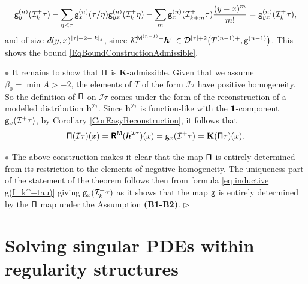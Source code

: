 \documentclass[10pt, reqno]{amsart}
\numberwithin{subsection}{section}
\numberwithin{subsubsection}{subsection}
\numberwithin{equation}{section} %
\newenvironment{Dem}[1][\unskip]{%
    \begin{list}{\hspace{1.15cm}{\sf \textbf{{\small Proof #1 --}}}}{%
        \setlength{\topsep}{0pt}%
        \setlength{\leftmargin}{0pt}%
        \setlength{\rightmargin}{0pt}%
        \setlength{\listparindent}{0pt}%
        \setlength{\itemindent}{0pt}%
        \setlength{\parsep}{0pt}%
        \addtolength{\leftmargin}{0pt}%
        \addtolength{\rightmargin}{0pt}%
    } \item }{\hfill $\rhd$\end{list}\smallskip}
\theoremstyle{mystyle}
\theoremstyle{mystyle2}
\theoremstyle{mystyle3}
\newcommand{\bsh}{\boldsymbol{h}}
\newcommand{\ssk}{\smallskip}
\newcommand{\mcD}{\mathcal{D}}
\newcommand{\mcI}{\mathcal{I}}
\newcommand{\mcK}{\mathcal{K}}
\newcommand{\bfK}{\mathbf{K}}
\begin{document}
\begin{Dem}
$$
{\sf g}^{(n)}_y(\mcI_k^+\tau)  -  \sum_{\eta<\tau} {\sf g}^{(n)}_x(\tau/\eta){\sf g}^{(n)}_{yx}(\mcI_k^+\eta)  -  \sum_m {\sf g}^{(n)}_x(\mcI_{k+m}^+\tau)\frac{(y - x)^m}{m!} = {\sf g}^{(n)}_{yx}(\mcI^+_k\tau),
$$
and of size $d(y,x)^{|\tau|+2-|k|_\frak{s}}$, since $\mcK^{{\sf M}^{(n-1)}+} \bsh^\tau\in\mcD^{|\tau|+2}\big(T^{(n-1)+}, {\sf g}^{(n-1)}\big)$. This shows the bound \eqref{EqBoundConstructionAdmissible}.

\textcolor{gray}{$\bullet$} It remains to show that ${\sf\Pi}$ is $\bfK$-admissible. Given that we assume $\beta_0=\min A>-2$, the elements of $T$ of the form $\mcI\tau$ have positive homogeneity. So the definition of ${\sf\Pi}$ on $\mcI\tau$ comes under the form of the reconstruction of a modelled distribution $\bsh^{\mcI\tau}$. Since $\bsh^{\mcI\tau}$ is function-like with the ${\bf1}$-component ${\sf g}_x(\mcI^+\tau)$, by Corollary \ref{CorEasyReconstruction}, it follows that
\begin{align*}
{\sf\Pi}(\mcI\tau)(x) = \textbf{\textsf{R}}^{\sf M} (\bsh^{\mcI\tau})(x) = {\sf g}_x(\mcI^+\tau) = \bfK({\sf\Pi}\tau)(x).
\end{align*}

\ssk

\textcolor{gray}{$\bullet$} The above construction makes it clear that the map $\sf \Pi$ is entirely determined from its restriction to the elements of negative homogeneity. The uniqueness part of the statement of the theorem follows then from formula \eqref{eq inductive g(I_k^+tau)} giving ${\sf g}_x(\mcI^+_k\tau)$ as it shows that the map $\sf g$ is entirely determined by the $\sf \Pi$ map under the Assumption \textbf{\textsf{(B1-B2)}}.
\end{Dem}   




\bigskip



\section{Solving singular PDEs within regularity structures}
\label{SectionSolvingPDEs}
\end{document}

